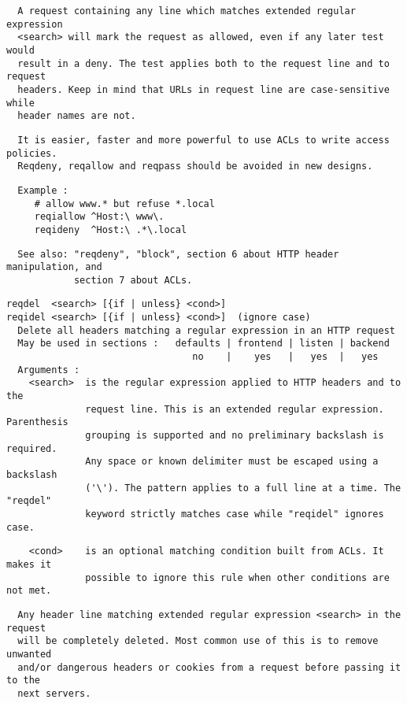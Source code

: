 \begin{verbatim}
  A request containing any line which matches extended regular expression
  <search> will mark the request as allowed, even if any later test would
  result in a deny. The test applies both to the request line and to request
  headers. Keep in mind that URLs in request line are case-sensitive while
  header names are not.
\end{verbatim}

\begin{verbatim}
  It is easier, faster and more powerful to use ACLs to write access policies.
  Reqdeny, reqallow and reqpass should be avoided in new designs.
\end{verbatim}

\begin{verbatim}
  Example :
     # allow www.* but refuse *.local
     reqiallow ^Host:\ www\.
     reqideny  ^Host:\ .*\.local
\end{verbatim}

\begin{verbatim}
  See also: "reqdeny", "block", section 6 about HTTP header manipulation, and
            section 7 about ACLs.
\end{verbatim}

\begin{verbatim}
reqdel  <search> [{if | unless} <cond>]
reqidel <search> [{if | unless} <cond>]  (ignore case)
  Delete all headers matching a regular expression in an HTTP request
  May be used in sections :   defaults | frontend | listen | backend
                                 no    |    yes   |   yes  |   yes
  Arguments :
    <search>  is the regular expression applied to HTTP headers and to the
              request line. This is an extended regular expression. Parenthesis
              grouping is supported and no preliminary backslash is required.
              Any space or known delimiter must be escaped using a backslash
              ('\'). The pattern applies to a full line at a time. The "reqdel"
              keyword strictly matches case while "reqidel" ignores case.
\end{verbatim}

\begin{verbatim}
    <cond>    is an optional matching condition built from ACLs. It makes it
              possible to ignore this rule when other conditions are not met.
\end{verbatim}

\begin{verbatim}
  Any header line matching extended regular expression <search> in the request
  will be completely deleted. Most common use of this is to remove unwanted
  and/or dangerous headers or cookies from a request before passing it to the
  next servers.
\end{verbatim}


